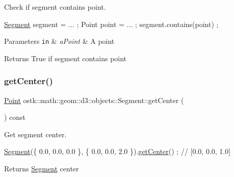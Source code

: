 Check if segment contains point. 


\begin{DoxyCode}
\hyperlink{classostk_1_1math_1_1geom_1_1d3_1_1objects_1_1_segment_aa2cb60ce06335a5f76120c658219494c}{Segment} segment = ... ;
Point point = ... ;
segment.contains(point) ;
\end{DoxyCode}



\begin{DoxyParams}[1]{Parameters}
\mbox{\tt in}  & {\em a\+Point} & A point \\
\hline
\end{DoxyParams}
\begin{DoxyReturn}{Returns}
True if segment contains point 
\end{DoxyReturn}
\mbox{\label{classostk_1_1math_1_1geom_1_1d3_1_1objects_1_1_segment_a7d37a80e12053ec307dfd8e4d3973843}} 
\subsubsection{\texorpdfstring{get\+Center()}{getCenter()}}
{\footnotesize\ttfamily \hyperlink{classostk_1_1math_1_1geom_1_1d3_1_1objects_1_1_point}{Point} ostk\+::math\+::geom\+::d3\+::objects\+::\+Segment\+::get\+Center (\begin{DoxyParamCaption}{ }\end{DoxyParamCaption}) const}



Get segment center. 


\begin{DoxyCode}
\hyperlink{classostk_1_1math_1_1geom_1_1d3_1_1objects_1_1_segment_aa2cb60ce06335a5f76120c658219494c}{Segment}(\{ 0.0, 0.0, 0.0 \}, \{ 0.0, 0.0, 2.0 \}).\hyperlink{classostk_1_1math_1_1geom_1_1d3_1_1objects_1_1_segment_a7d37a80e12053ec307dfd8e4d3973843}{getCenter}() ; \textcolor{comment}{// [0.0, 0.0, 1.0]}
\end{DoxyCode}


\begin{DoxyReturn}{Returns}
\hyperlink{classostk_1_1math_1_1geom_1_1d3_1_1objects_1_1_segment}{Segment} center 
\end{DoxyReturn}
\mbox{\label{classostk_1_1math_1_1geom_1_1d3_1_1objects_1_1_segment_ab708b9d0ab53ef8b15974244810a732f}} 
